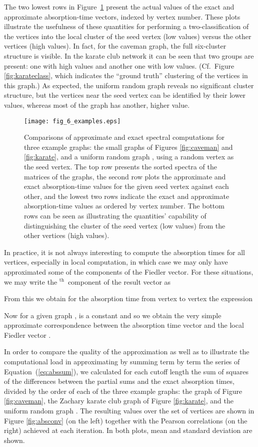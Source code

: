 \documentclass{article}
\newcommand{\superscript}[1]{\ensuremath{^\textrm{#1}}}
\renewcommand{\th}{\superscript{th}}
\begin{document}
The two lowest rows in Figure~\ref{fig:examples} present the
actual values of the exact and approximate absorption-time vectors,
indexed by vertex number. These plots illustrate the usefulness
of these quantities for performing a two-classification of
the vertices into the local cluster of the seed vertex
(low values) versus the other vertices (high values).
In fact, for the caveman graph, the full
six-cluster structure is visible. In the karate club network it can be
seen that two groups are present: one with high values and another one
with low values. (Cf.\ Figure \ref{fig:karateclass}, which indicates
the ``ground truth'' clustering of the vertices in this graph.)
As expected, the uniform random graph
reveals no significant cluster structure, but the vertices near the
seed vertex can be identified by their lower values, whereas most of
the graph has another, higher value. 

\begin{figure}
\centerline{\texttt{[image: fig\_6\_examples.eps]}}
\caption{Comparisons of approximate and exact spectral computations
  for three
  example graphs: the small graphs of Figures \ref{fig:caveman} and
  \ref{fig:karate}, and a uniform random graph ,
  using a random vertex as the seed vertex.
  The top row presents the sorted spectra of the
   matrices of the graphs,
  the second row plots the approximate and exact absorption-time
  values for the given seed vertex against each other,
  and the lowest two rows indicate the exact and approximate
  absorption-time values as ordered by vertex number.
  The bottom rows can be seen as illustrating the quantities'
  capability of distinguishing the cluster of the seed vertex
  (low values) from the other vertices (high values).}
\label{fig:examples}
\end{figure}

In practice, it is not always interesting to compute the absorption
times for all vertices, especially in local computation, in which case
we may only have approximated some of the components of the Fiedler
vector. For these situations, we may write the \th\ component of
the result vector as

From this we obtain for the absorption time from vertex 
to vertex  the expression

Now for a given graph ,  is a constant and so we obtain
the very simple approximate correspondence  between the absorption time vector  and the local
Fiedler vector .

In order to compare the quality of the approximation as well as to
illustrate the computational load in approximating by summing term by
term the series of Equation~(\ref{eq:abssum}), we calculated for each
cutoff length the sum of squares of the differences between the
partial sums and the exact absorption times, divided by the order of
each of the three example graphs: the graph of Figure
\ref{fig:caveman}, the Zachary karate club graph of Figure
\ref{fig:karate}, and the uniform random graph . The resulting values over the set of vertices are shown in
Figure \ref{fig:absconv} (on the left) together with the Pearson
correlations (on the right) achieved at each iteration.  In both
plots, mean and standard deviation are shown.
\end{document}
